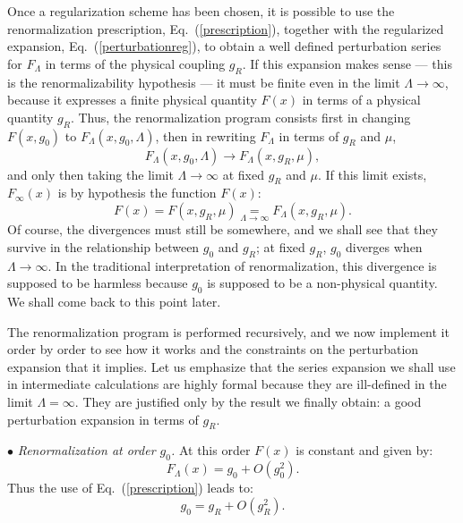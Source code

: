 \documentclass[floatfix,twocolumn,preprintnumbers,amsmath,amssymb,prb]{revtex4}
\begin{document}
Once a regularization scheme has been chosen, it is possible to use
the renormalization prescription, Eq.~(\ref{prescription}),
together with the regularized expansion,
Eq.~(\ref{perturbationreg}), to obtain a well defined perturbation
series for
$F_\Lambda$ in terms of the physical coupling $g_R$. If this
expansion makes sense --- this is the renormalizability hypothesis
--- it must be finite even in the limit $\Lambda\to \infty$, because
it expresses a finite physical quantity $F(x)$ in terms of a
physical quantity
$g_R$. Thus, the renormalization program consists first in changing 
$F(x,g_0)$ to $F_\Lambda(x,g_0,\Lambda)$, then in rewriting
$F_\Lambda$ in terms of $g_R$ and $\mu$,
\begin{equation}
F_\Lambda(x,g_0,\Lambda) \to F_\Lambda(x,g_R,\mu),
\end{equation}
and only then taking the limit $\Lambda\to\infty$ at fixed $g_R$
and $\mu$. If this limit exists, $F_{\infty}(x)$ is by
hypothesis the function
$F(x)$:
\begin{equation}
F(x)=F(x,g_R,\mu)\underset{\Lambda\to\infty}{=}F_\Lambda(x,g_R,\mu).
\end{equation} 
Of course, the divergences must still be somewhere, and we
shall see that they survive in the relationship between $g_0$ and
$g_R$; at fixed $g_R$, $g_0$ diverges when $\Lambda\to\infty$. In
the traditional interpretation of renormalization, this divergence
is supposed to be harmless because $g_0$ is supposed to be a
non-physical quantity. We shall come back to this point later. 

The renormalization program is performed recursively, and we
now implement it order by order to see how it works and the
constraints on the perturbation expansion that it implies. Let us
emphasize that the series expansion we shall use in intermediate
calculations are highly formal because they are ill-defined in the
limit $\Lambda=\infty$. They are justified only by the result we
finally obtain: a good perturbation expansion in terms of
$g_R$.\cite{foot6}

$\bullet$ {\it Renormalization at order $g_0$.} At this order $F(x)$ is constant and given by:
\begin{equation}
F_\Lambda(x)= g_0 + O(g_0^2).
\end{equation} 
Thus the use of Eq.~(\ref{prescription}) leads to:
\begin{equation}
g_0=g_R+O(g_R^2).
\end{equation}
\end{document}
